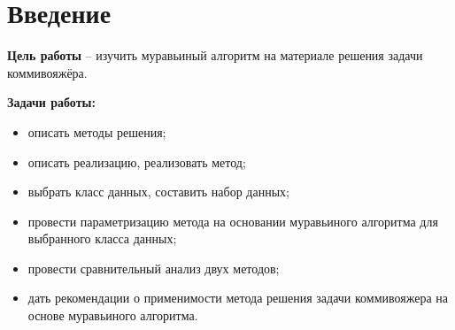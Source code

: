 \chapter*{Введение}
\textbf{Цель работы} – изучить муравьиный алгоритм на материале решения задачи коммивояжёра.

\textbf{Задачи работы:}
\begin{itemize}
	\item описать методы решения;
	\item описать реализацию, реализовать метод;
	\item выбрать класс данных, составить набор данных;
	\item провести параметризацию метода на основании муравьиного алгоритма   для выбранного класса данных;
	\item провести сравнительный анализ двух методов;
	\item дать рекомендации о применимости метода решения задачи коммивояжера на основе муравьиного алгоритма.
\end{itemize}